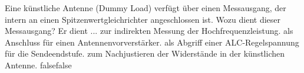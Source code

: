     {Eine künstliche Antenne (Dummy Load) verfügt über einen Messausgang, der intern an einen Spitzenwertgleichrichter angeschlossen ist. Wozu dient dieser Messausgang? Er dient ...}
    {zur indirekten Messung der Hochfrequenzleistung.}
    {als Anschluss für einen Antennenvorverstärker.}
    {als Abgriff einer ALC-Regelspannung für die Sendeendstufe.}
    {zum Nachjustieren der Widerstände in der künstlichen Antenne.}
    {false}{false}